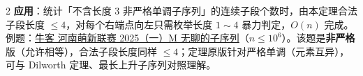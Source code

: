 \begin{multicols*}{2}
		\textbf{应用}：统计「不含长度 $3$ 非严格单调子序列」的连续子段个数时，由本定理合法子段长度 $\le 4$，对每个右端点向左只需枚举长度 $1 \sim 4$ 暴力判定，$O(n)$ 完成。例题：\href{https://ac.nowcoder.com/acm/contest/113664/M}{牛客 河南萌新联赛 2025（一）M 无聊的子序列}（$n \le 10^6$）。该题是\textbf{非严格}版（允许相等），合法子段长度同样 $\le 4$；定理原版针对严格单调（元素互异），可与 Dilworth 定理、最长上升子序列对照理解。


	\end{multicols*}





